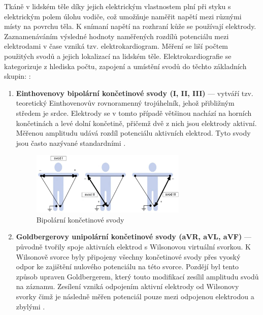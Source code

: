 Tkáně v lidském těle díky jejich elektrickým vlastnostem plní při styku s
elektrickým polem úlohu vodiče, což umožňuje naměřit napětí mezi různými místy
na povrchu těla. K snímaní napětí na rozhraní kůže se používají elektrody.
Zaznamenáváním výsledné hodnoty naměřených rozdílů potenciálu mezi elektrodami v
čase vzniká tzv. elektrokardiogram. Měření se liší počtem použitých svodů a
jejich lokalizací na lidském těle. Elektrokardiografie se kategorizuje z
hlediska počtu, zapojení a umístění svodů do těchto základních skupin:
\cite{Haberl2012,Kittnar2020}:
\begin{enumerate}
	\item \textbf{Einthovenovy bipolární končetinové svody (I, II, III)} ---
	      vytváří tzv. teoretický Einthovenovův rovnoramenný trojúhelník, jehož
	      přibližným středem je srdce. Elektrody se v tomto případě většinou
	      nachází na horních končetinách a levé dolní končetině, přičemž dvě z
	      nich jsou elektrody aktivní. Měřenou amplitudu udává rozdíl potenciálu
	      aktivních elektrod. Tyto svody jsou často nazývané standardními
	      \cite{Kittnar2020}.
	      \begin{figure}[h]
		      \begin{center}
			      \includegraphics[width=0.7\textwidth]{../assets/anatomy/bipolar}
			      \caption{Bipolární končetinové svody \cite{Kittnar2020}}
			      \label{fig:bipolar}
		      \end{center}
	      \end{figure}
	\item \textbf{Goldbergerovy unipolární končetinové svody (aVR, aVL, aVF)}
	      --- původně tvořily spoje aktivních elektrod s Wilsonovou virtuální
	      svorkou. K Wilsonově svorce byly připojeny všechny končetinové svody
	      přes vyoský odpor ke zajištění nulového potenciálu na této svorce.
	      Pozdějí byl tento způsob upraven Goldbergerem, který touto modifikací
	      zesílil amplitudu svodů na záznamu. Zesílení vzniká odpojením aktivní
	      elektrody od Wilsonovy svorky čimž je následně měřen potenciál pouze
	      mezi odpojenou elektrodou a zbylými \cite{Kittnar2020}.
	      \begin{figure}[H]

\end{figure}
\end{enumerate}
